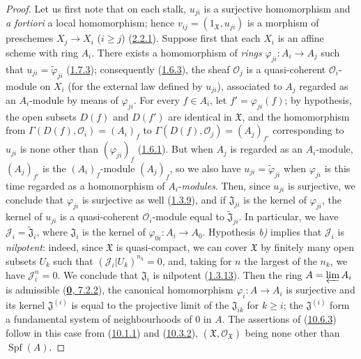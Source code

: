 \begin{proof}
Let us first note that on each stalk, $u_{ji}$ is a surjective
homomorphism and \emph{a fortiori} a local homomorphism; hence
$v_{ij}=(1_{\mathfrak{X}},u_{ji})$ is a morphism of preschemes
$X_j\to X_i$ ($i\geq j$) (\hyperref[I.2.2.1]{2.2.1}). Suppose
first that each $X_i$ is an affine scheme with ring $A_i$. There exists
a homomorphism of \emph{rings}
$\varphi_{ji}:A_i\to A_j$ such that
$u_{ji}=\widetilde{\varphi}_{ji}$
(\hyperref[I.1.7.3]{1.7.3}); consequently
(\hyperref[I.1.6.3]{1.6.3}), the sheaf $\mathscr{O}_j$ is a
quasi-coherent $\mathscr{O}_i$-module on $X_i$ (for the external law
defined by $u_{ji}$), associated to $A_j$ regarded as an $A_i$-module by
means of $\varphi_{ji}$. For every $f\in A_i$, let
$f'=\varphi_{ji}(f)$; by hypothesis, the open subsets $D(f)$ and $D(f')$
are identical in $\mathfrak{X}$, and the homomorphism from
$\Gamma(D(f),\mathscr{O}_i)=(A_i)_f$ to
$\Gamma(D(f),\mathscr{O}_j)=(A_j)_{f'}$ corresponding to $u_{ji}$ is
none other than $(\varphi_{ji})_f$ (\hyperref[I.1.6.1]{1.6.1}). But
when $A_j$ is regarded as an $A_i$-module, $(A_j)_{f'}$ is the
$(A_i)_f$-module $(A_j)_f$, so we also have
$u_{ji}=\widetilde{\varphi}_{ji}$ when $\varphi_{ji}$ is this time
regarded as a homomorphism of $A_i$-\emph{modules}. Then, since $u_{ji}$ is
surjective, we conclude that $\varphi_{ji}$ is surjective as well
(\hyperref[I.1.3.9]{1.3.9}), and if $\mathfrak{J}_{ji}$ is the kernel of
$\varphi_{ji}$, the kernel of $u_{ji}$ is a quasi-coherent
$\mathscr{O}_i$-module equal to $\widetilde{\mathfrak{J}}_{ji}$. In
particular, we have $\mathscr{J}_i=\widetilde{\mathfrak{J}}_i$, where
$\mathfrak{J}_i$ is the kernel of $\varphi_{0i}:A_i\to A_0$. Hypothesis
\emph{b)} implies that $\mathscr{J}_i$ is \emph{nilpotent}: indeed, since
$\mathfrak{X}$ is quasi-compact, we can cover $\mathfrak{X}$ by finitely
many open subsets $U_k$ such that $(\mathscr{J}_i|U_k)^{n_k}=0$, and,
taking for $n$ the largest of the $n_k$, we have $\mathscr{J}_i^n=0$. We
conclude that $\mathfrak{J}_i$ is nilpotent
(\hyperref[I.1.3.13]{1.3.13}). Then the ring $A=\varprojlim A_i$ is
admissible (\hyperref[0.7.2.2]{\textbf{0}, 7.2.2}), the canonical homomorphism
$\varphi_i:A\to A_i$ is surjective and its kernel
$\mathfrak{J}^{(i)}$ is equal to the projective limit of the
$\mathfrak{J}_{ik}$ for $k\geq i$; the $\mathfrak{J}^{(i)}$ form
a fundamental system of neighbourhoods of 0 in $A$. The assertions of
(\hyperref[I.10.6.3]{10.6.3}) follow in this case from
(\hyperref[I.10.1.1]{10.1.1}) and
(\hyperref[I.10.3.2]{10.3.2}),
$(\mathfrak{X},\mathscr{O}_{\mathfrak{X}})$ being none other than
$\operatorname{Spf}(A)$.


\end{proof}
